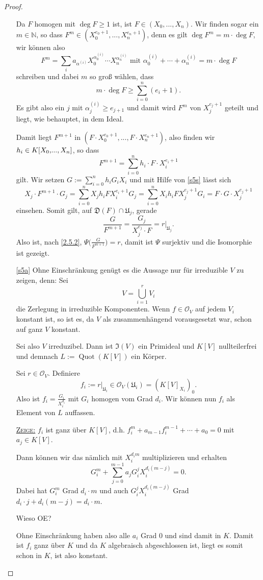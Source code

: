 \documentclass[a4paper,12pt,index=toc]{scrbook}
\theoremstyle{keinenummern} %
\def\I{\mathfrak{I}}
\def\O{\mathcal{O}}
\newcommand{\D}{\mathfrak{D}}
\def\U{\mathfrak{U}}
\newcommand{\Quot}{\operatorname{Quot}}
\newcommand{\restrict}[1]{|_{#1}}
\renewcommand{\dotsc}{\ensuremath{\!...}}
\newcommand{\set}[1]{\ensuremath{\mathbb{#1}}}
\newcommand{\N}{\set{N}}
\newcommand{\ppolyx}[1][n]{\ensuremath%
  [X_{0},\dotsc,X_{#1}]}
\begin{document}
\begin{proof}
\begin{enumerate}
Da $F$ homogen mit $\deg F\geq 1$ ist, ist $F\in(X_{0},\dotsc,X_{n})$. Wir finden sogar ein $m\in\N$, so dass $F^{m}\in(X_{0}^{e_{0}+1},\dotsc,X_{n}^{e_{n}+1})$, denn es gilt $\deg F^{m}=m\cdot\deg F$, wir können also
\[F^{m}=\sum_{i}a_{\alpha^{(i)}}X_{0}^{\alpha_{0}^{(i)}}\dotsm X_{n}^{\alpha_{n}^{(i)}}\text{ mit }\alpha_{0}^{(i)}+\dotsm+\alpha_{n}^{(i)}=m\cdot\deg F\]
schreiben und dabei $m$ so groß wählen, dass
\[m\cdot\deg F\geq\sum_{i=0}^{n}(e_{i}+1).\]
Es gibt also ein $j$ mit $\alpha_{j}^{(i)}\geq e_{j+1}$ und damit wird $F^{m}$ von $X_{j}^{e_{j}+1}$ geteilt und liegt, wie behauptet, in dem Ideal.

Damit liegt $F^{m+1}$ in $(F\cdot X_{0}^{e_{0}+1},\dotsc,F\cdot X_{n}^{e_{n}+1})$, also finden wir $h_{i}\in K\ppolyx$, so dass
\[F^{m+1}=\sum_{i=0}^{n}h_{i}\cdot F\cdot X_{i}^{e_{i}+1}\]
gilt. Wir setzen $\displaystyle G:=\sum_{i=0}^{n}h_{i}G_{i}X_{i}$ und mit Hilfe von \cref{s5s} lässt sich
\[X_{j}\cdot F^{m+1}\cdot G_{j}=\sum_{i=0}^{n}X_{j}h_{i}FX_{i}^{e_{i}+1}G_{j}=\sum_{i=0}^{n}X_{i}h_{i}FX_{j}^{e_{j}+1}G_{i}=F\cdot G\cdot X_{j}^{e_{j}+1}\]
einsehen. Somit gilt, auf $\D(F)\cap \U_{j}$, gerade \[\frac{G}{F^{m+1}}=\frac{G_{j}}{X_{j}^{e_{j}}\cdot F}=r\restrict{\U_{j}}.\] Also ist, nach \cref{2.5.2}, $\Psi\bigl(\frac{G}{F^{m+1}}\bigr)=r$, damit ist $\Psi$ surjektiv und die Isomorphie ist gezeigt.

\item[\ref{s5a}] Ohne Einschränkung genügt es die Aussage nur für irreduzible $V$ zu zeigen, denn: Sei
\[V=\bigcup_{i=1}^{r}V_{i}\]
die Zerlegung in irreduzible Komponenten. Wenn $f\in\O_{V}$ auf jedem $V_{i}$ konstant ist, so ist es, da $V$ als zusammenhängend vorausgesetzt war, schon auf ganz $V$ konstant.

Sei also $V$ irreduzibel. Dann ist $\I(V)$ ein Primideal und $K[V]$ nullteilerfrei und demnach $L:=\Quot(K[V])$ ein Körper.

Sei $r\in\O_{V}$. Definiere
\[f_{i}:=r\restrict{\U_{i}}\in\O_{V}(\U_{i})=(K[V]_{X_{i}})_{0}.\]
Also ist $f_{i}=\frac{G_{i}}{X_{i}^{d_{i}}}$ mit $G_{i}$ homogen vom Grad $d_{i}$. Wir können nun $f_{i}$ als Element von $L$ auffassen.

\hyperlink{s5bzz}{{\scshape Zeige:}} $f_{i}$ ist ganz über $K[V]$, d.h. $f_{i}^{m}+a_{m-1}f_{i}^{m-1}+\dotsm+a_{0}=0$ mit $a_{j}\in K[V]$.

Dann können wir das nämlich mit $X_{i}^{d_{i}m}$ multiplizieren und erhalten
\[G_{i}^{m}+\sum_{j=0}^{m-1}a_{j}G_{i}^{j}X_{i}^{d_{i}(m-j)}=0.\]
Dabei hat $G_{i}^{m}$ Grad $d_{i}\cdot m$ und auch $G_{i}^{j}X_{i}^{d_{i}(m-j)}$ Grad $d_{i}\cdot j+d_{i}(m-j)=d_{i}\cdot m$.
\begin{w}Wieso OE?\end{w}
Ohne Einschränkung haben also alle $a_{i}$ Grad $0$ und sind damit in $K$. Damit ist $f_{i}$ ganz über $K$ und da $K$ algebraisch abgeschlossen ist, liegt es somit schon in $K$, ist also konstant.


\end{enumerate}
\end{proof}
\end{document}
